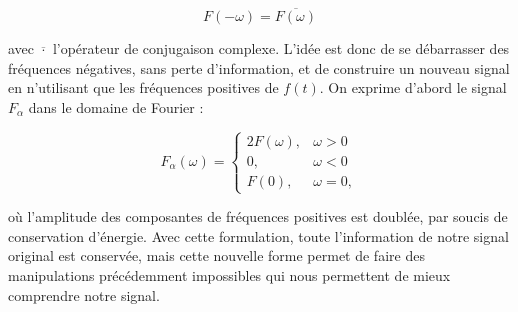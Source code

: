 \begin{equation}
    F(-\omega) = \overline{F(\omega)}
\end{equation}

avec $\overline{\cdot}$ l'opérateur de conjugaison complexe. L'idée est donc de se débarrasser des fréquences négatives, sans perte d'information, et de construire un nouveau signal en n'utilisant que les fréquences positives de $f(t)$. On exprime d'abord le signal $F_{\alpha}$ dans le domaine de Fourier :

\begin{equation}
    F_{\alpha}(\omega) = \left\{
    \begin{array}{ll}
        2F(\omega), & \omega > 0 \\
        0, & \omega < 0 \\
        F(0), & \omega = 0,
    \end{array}
    \right.
\end{equation}

où l'amplitude des composantes de fréquences positives est doublée, par soucis de conservation d'énergie. Avec cette formulation, toute l'information de notre signal original est conservée, mais cette nouvelle forme permet de faire des manipulations précédemment impossibles qui nous permettent de mieux comprendre notre signal.

